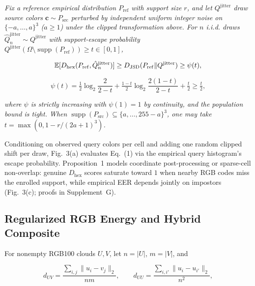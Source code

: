 \begin{proposition}\label{prop:1}\normalfont \emph{Fix a reference empirical distribution $P_{\mathrm{ref}}$ with support size $r$, and let $Q^{\mathrm{jitter}}$ draw source colors $\mathbf c\sim P_{\mathrm{src}}$ perturbed by independent uniform integer noise on $\{-a,\ldots,a\}^3$ ($a\ge1$) under the clipped transformation above. For $n$ i.i.d. draws $\hat Q_n^{\mathrm{jitter}}\sim Q^{\mathrm{jitter}}$ with support-escape probability $Q^{\mathrm{jitter}}(\Omega\setminus\operatorname{supp}(P_{\mathrm{ref}}))\ge t\in[0,1]$,}


\begin{equation*}
\mathbb E[D_{\mathrm{hex}}{}(P_{\mathrm{ref}},\hat Q_n^{\mathrm{jitter}})]\ge D_{\mathrm{JSD}}(P_{\mathrm{ref}}\|Q^{\mathrm{jitter}})\ge\psi(t),
\end{equation*}

\begin{equation}
\psi(t)=\tfrac12\log_2\frac2{2-t}+\tfrac{1-t}{2}\log_2\frac{2(1-t)}{2-t}+\tfrac t2\ge\tfrac t2,
\end{equation}

\noindent \emph{where $\psi$ is strictly increasing with $\psi(1)=1$ by continuity, and the population bound is tight. When $\operatorname{supp}(P_{\mathrm{src}})\subseteq\{a,\ldots,255-a\}^3$, one may take $t=\max(0,1-r/(2a+1)^3)$.}


\end{proposition}

Conditioning on observed query colors per cell and adding one random clipped shift per draw, Fig.~3(a) evaluates Eq.~(1) via the empirical query histogram's escape probability. Proposition~1 models coordinate post-processing or sparse-cell non-overlap: genuine $D_{\mathrm{hex}}$ scores saturate toward $1$ when nearby RGB codes miss the enrolled support, while empirical EER depends jointly on impostors (Fig.~3(c); proofs in Supplement~G).

\subsection{Regularized RGB Energy and Hybrid Composite}

For nonempty RGB100 clouds $U,V$, let $n=|U|$, $m=|V|$, and


\begin{equation*}
d_{UV}=\frac{\sum_{i,j}\|u_i-v_j\|_2}{nm},\qquad d_{UU}=\frac{\sum_{i,i'}\|u_i-u_{i'}\|_2}{n^2},
\end{equation*}

